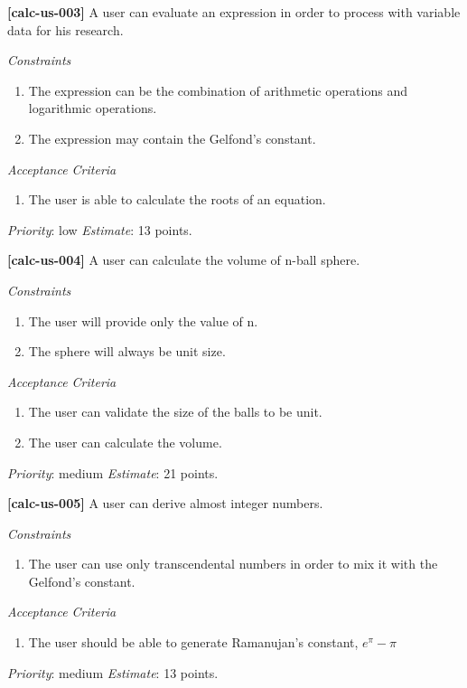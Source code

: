 \documentclass{article}
\begin{document}
\begin{flushleft}
\textbf{[calc-us-003]} A user can evaluate an expression in order to process with variable data for his research.
\end{flushleft}
\textit{Constraints}
\begin{enumerate}
    \item The expression can be the combination of arithmetic operations and logarithmic operations.
    \item The expression may contain the Gelfond's constant.
\end{enumerate}
\textit{Acceptance Criteria}
\begin{enumerate}
    \item The user is able to calculate the roots of an equation.
\end{enumerate}
\textit{Priority}: low \newline
\textit{Estimate}: 13 points.

\begin{flushleft}
\textbf{[calc-us-004]} A user can calculate the volume of n-ball sphere.
\end{flushleft}
\textit{Constraints}
\begin{enumerate}
    \item The user will provide only the value of n.
    \item The sphere will always be unit size. 
\end{enumerate}
\textit{Acceptance Criteria}
\begin{enumerate}
    \item The user can validate the size of the balls to be unit.
    \item The user can calculate the volume.
\end{enumerate}
\textit{Priority}: medium \newline
\textit{Estimate}: 21 points.

\begin{flushleft}
\textbf{[calc-us-005]} A user can derive almost integer numbers.
\end{flushleft}
\textit{Constraints}
\begin{enumerate}
    \item The user can use only transcendental numbers in order to mix it with the Gelfond's constant.
\end{enumerate}
\textit{Acceptance Criteria}
\begin{enumerate}
    \item The user should be able to generate Ramanujan's constant, $e^{\pi} - \pi$
\end{enumerate}
\textit{Priority}: medium \newline
\textit{Estimate}: 13 points.
\end{document}

